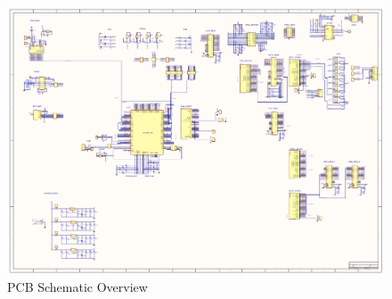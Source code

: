 \begin{figure}[h]
  \centering
  \includegraphics{fig/pcb/pcbschematic.pdf}
  \caption{PCB Schematic Overview}
  \label{fig:schematic-pcb}
\end{figure}
